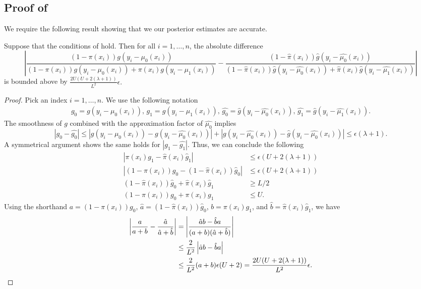 \subsection{Proof of }

We require the following result showing that we our posterior estimates are accurate.

\begin{lemma}
\label{lem:additive-posterior-approximation}
Suppose that the conditions of  hold. Then for all $i=1,\ldots, n$, the absolute difference
\[ \left|\frac{(1-{\pi}(x_i)) {g}(y_i - \mu_0(x_i))}{(1-{\pi}(x_i)) {g}(y_i - \mu_0(x_i)) + {\pi}(x_i) {g}(y_i - \mu_1(x_i))} - \frac{(1-\hat{\pi}(x_i)) \hat{g}(y_i - \hat{\mu_0}(x_i))}{(1-\hat{\pi}(x_i)) \hat{g}(y_i - \hat{\mu_0}(x_i)) + \hat{\pi}(x_i) \hat{g}(y_i - \hat{\mu_1}(x_i))} \right| \]
is bounded above by $\frac{2U(U+2(\lambda + 1))}{L^2} \epsilon. $
\end{lemma}
\begin{proof}
Pick an index $i=1, \ldots, n$. We use the following notation
\begin{align*}
g_0 = {g}(y_i - \mu_0(x_i)), \, 
g_1 = {g}(y_i - \mu_1(x_i)), \,
\hat{g_0} = \hat{g}(y_i - \hat{\mu_0}(x_i)), \,
\hat{g_1} = \hat{g}(y_i - \hat{\mu_1}(x_i)).
\end{align*}
The smoothness of $g$ combined with the approximation factor of $\hat{\mu_0}$ implies
\[ |g_0 - \hat{g_0}| \leq |{g}(y_i - \mu_0(x_i)) - {g}(y_i - \hat{\mu_0}(x_i))| + |{g}(y_i - \hat{\mu_0}(x_i)) - \hat{g}(y_i - \hat{\mu_0}(x_i))| \leq \epsilon(\lambda + 1).\]
A symmetrical argument shows the same holds for $|g_1 - \hat{g_1}|$. Thus, we can conclude the following
\begin{align*}
|\pi(x_i) g_1 - \hat{\pi}(x_i)\hat{g}_1| &\leq \epsilon(U + 2(\lambda + 1) ) \\
|(1-\pi(x_i)) g_0 - (1-\hat{\pi}(x_i))\hat{g}_0 | &\leq \epsilon(U + 2(\lambda + 1) ) \\
(1-\hat{\pi}(x_i))\hat{g}_0  + \hat{\pi}(x_i)\hat{g}_1 &\geq L/2 \\ 
(1-{\pi}(x_i)){g}_0  + {\pi}(x_i){g}_1 &\leq U.
\end{align*}
Using the shorthand $a = (1-\pi(x_i)) g_0$, $\hat{a} = (1-\hat{\pi}(x_i))\hat{g}_0$, $b = \pi(x_i) g_1$, and $\hat{b} = \hat{\pi}(x_i)\hat{g}_1$, we have
\begin{align*}
\left| \frac{a}{a+b} - \frac{\hat{a}}{\hat{a} + \hat{b}} \right| 
&= \left|\frac{\hat{a}b - \hat{b}a}{(a+b)(\hat{a} + \hat{b})} \right| \\
&\leq \frac{2}{L^2}\left|\hat{a}b - \hat{b}a\right| \\
&\leq \frac{2}{L^2} (a+b) \epsilon (U + 2) = \frac{2U(U+2(\lambda + 1))}{L^2} \epsilon. \qedhere
\end{align*}

\end{proof}


